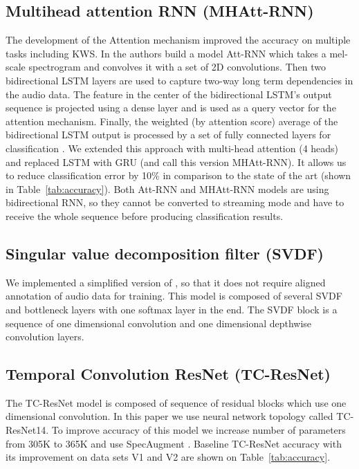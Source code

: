 \documentclass[a4paper]{article}
\begin{document}
\subsection{Multihead attention RNN (MHAtt-RNN)}
The development of the Attention mechanism \cite{ATT0, ATT1} improved the accuracy on multiple tasks including KWS\cite{ATT2}. In \cite{ATT2} the authors build a model Att-RNN which takes a mel-scale spectrogram and convolves it with a set of 2D convolutions. Then two bidirectional LSTM \cite{LSTM1} layers are used to capture two-way long term dependencies in the audio data. The feature in the center of the bidirectional LSTM’s output sequence is projected using a dense layer and is used as a query vector for the attention mechanism. Finally, the weighted (by attention score) average of the bidirectional LSTM output is processed by a set of fully connected layers for classification \cite{ATT2}. We extended this approach with multi-head attention (4 heads) and replaced LSTM with GRU (and call this version MHAtt-RNN). It allows us to reduce classification error by 10\% in comparison to the state of the art (shown in Table~\ref{tab:accuracy}). Both Att-RNN and MHAtt-RNN models are using bidirectional RNN, so they cannot be converted to streaming mode and have to receive the whole sequence before producing classification results.

\subsection{Singular value decomposition filter (SVDF)}
We implemented a simplified version of \cite{SVDF1}, so that it does not require aligned annotation of audio data for training. This model is composed of several SVDF and bottleneck layers with one softmax layer in the end. The SVDF block is a sequence of one dimensional convolution and one dimensional depthwise convolution layers\cite{SVDF1}.

\subsection{Temporal Convolution ResNet (TC-ResNet)}
The TC-ResNet model\cite{TEMPCONV} is composed of sequence of residual blocks which use one dimensional convolution. In this paper we use neural network topology called TC-ResNet14\cite{TEMPCONV}. To improve accuracy of this model we increase number of parameters from 305K to 365K and use SpecAugment \cite{SPEC}. Baseline TC-ResNet accuracy with its improvement on data sets V1 and V2 are shown on Table~\ref{tab:accuracy}.
\end{document}
